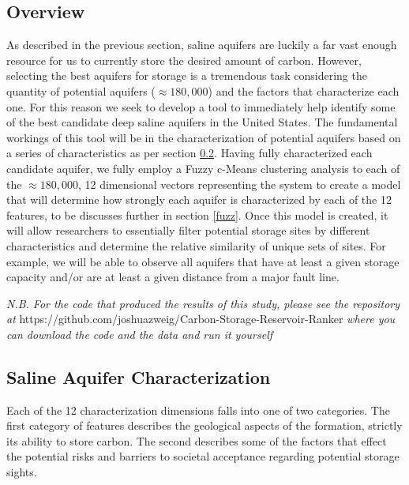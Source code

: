 \documentclass[letterpaper, 12pt]{article}
\begin{document}
\subsection{Overview}
As described in the previous section, saline aquifers are luckily a far vast enough resource for us to currently store the desired amount of carbon. However, selecting the best aquifers for storage is a tremendous task considering the quantity of potential aquifers ($\approx180,000$) and the factors that characterize each one. For this reason we seek to develop a tool to immediately help identify some of the best candidate deep saline aquifers in the United States. 
The fundamental workings of this tool will be in the characterization of potential aquifers based on a series of characteristics as per section \ref{wellchar}. Having fully characterized each candidate aquifer, we fully employ a Fuzzy c-Means clustering analysis to each of the $\approx180,000$, 12 dimensional vectors representing the system to create a model that will determine how strongly each aquifer is characterized by each of the 12 features, to be discusses further in section \ref{fuzz}. Once this model is created, it will allow researchers to essentially filter potential storage sites by different characteristics and determine the relative similarity of unique sets of sites. For example, we will be able to observe all aquifers that have at least a given storage capacity and/or are at least a given distance from a major fault line.  

\noindent \emph{N.B. For the code that produced the results of this study, please see the repository \\at} https://github.com/joshuazweig/Carbon-Storage-Reservoir-Ranker \emph{where you can download the code and the data and run it yourself}

\subsection{Saline Aquifer Characterization} \label{wellchar}
Each of the 12 characterization dimensions falls into one of two categories. The first category of features describes the geological aspects of the formation, strictly its ability to store carbon. The second describes some of the factors that effect the potential risks and barriers to societal acceptance regarding potential storage sights.
\end{document}
